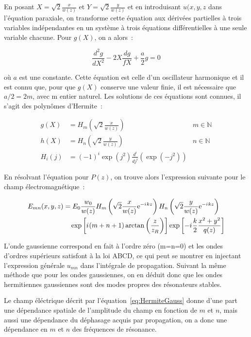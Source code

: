 \documentclass[a4paper]{book}
\newcommand{\iu}{{i\mkern1mu}}
\begin{document}
En posant $X=\sqrt{2}\frac{x}{w(z)}$ et $Y=\sqrt{2}\frac{y}{w(z)}$ et en introduisant $u(x,y,z$ dans l'équation paraxiale, on transforme cette équation aux dérivées partielles à trois variables indépendantes en un système à trois équations différentielles à une seule variable chacune. Pour $g(X)$, on a alors~:

\begin{equation}
    \frac{d^2g}{dX^2}-2X\frac{dg}{fX}+\frac{a}{2}g=0
\end{equation}

où $a$ est une constante. 
Cette équation est celle d'un oscillateur harmonique et il est connu que, pour que $g(X)$ conserve une valeur finie, il est nécessaire que $a/2=2m$, avec m entier naturel. Les solutions de ces équations sont connues, il s'agit des polynômes d'Hermite~:

\begin{align}
    g(X)&=H_m\left(\sqrt{2}\frac{x}{w(z)}\right)\quad&m\in\mathbb{N}\\
    h(X)&=H_n\left(\sqrt{2}\frac{y}{w(z)}\right)\quad&n\in\mathbb{N}\\
    H_i(j)&=(-1)^i\exp(j^2)\frac{d^i}{dj^i}\left(\exp(-j^2)\right)
\end{align}

En résolvant l'équation pour $P(z)$, on trouve alors l'expression suivante pour le champ électromagnétique~:

\begin{equation}
    \begin{split}
        E_{mn}(x,y,z)&=E_0\frac{w_0}{w(z)}H_m\left(\sqrt{2}\frac{x}{w(z)}\mathrm{e}^{-\iu k z}\right)H_n\left(\sqrt{2}\frac{y}{w(z)}\mathrm{e}^{-\iu k z}\right)\\
        &\quad\exp\left[\iu (m+n+1)\arctan\left(\frac{z}{z_R}\right)\right]\exp\left[-\iu \frac{k}{2}\frac{x^2+y^2}{q(z)}\right]
        \label{eq:HermiteGauss}
    \end{split}
\end{equation}

L'onde gaussienne correspond en fait à l'ordre zéro (m=n=0) et les ondes d'ordres supérieurs satisfont à la loi ABCD, ce qui peut se montrer en injectant l'expression générale $u_{mn}$ dans l'intégrale de propagation.
Suivant la même méthode que pour les ondes gaussiennes, on en déduit donc que les ondes hermitiennes gaussiennes sont des modes propres des résonateurs stables.

Le champ éléctrique décrit par l'équation~\ref{eq:HermiteGauss} donne d'une part une dépendance spatiale de l'amplitude du champ en fonction de $m$ et $n$, mais aussi une dépendance du déphasage acquis par propagation, on a donc une dépendance en $m$ et $n$ des fréquences de résonance. 
\end{document}
